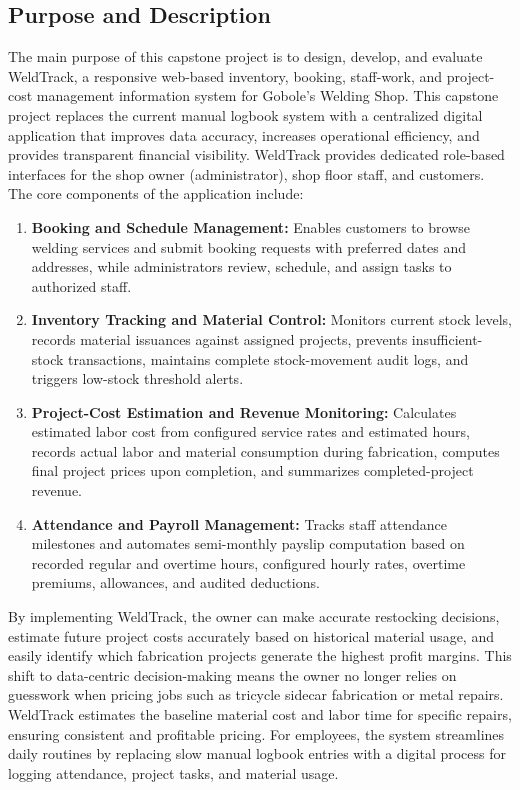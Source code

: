 \documentclass[12pt, letterpaper]{article}
\begin{document}
\subsection{Purpose and Description}
\hspace*{2em}The main purpose of this capstone project is to design, develop, and evaluate WeldTrack, a responsive web-based inventory, booking, staff-work, and project-cost management information system for Gobole's Welding Shop. This capstone project replaces the current manual logbook system with a centralized digital application that improves data accuracy, increases operational efficiency, and provides transparent financial visibility.
\hspace*{2em}WeldTrack provides dedicated role-based interfaces for the shop owner (administrator), shop floor staff, and customers. The core components of the application include:
\begin{enumerate}[label=\alph*.]
    \item \textbf{Booking and Schedule Management:} Enables customers to browse welding services and submit booking requests with preferred dates and addresses, while administrators review, schedule, and assign tasks to authorized staff.
    \item \textbf{Inventory Tracking and Material Control:} Monitors current stock levels, records material issuances against assigned projects, prevents insufficient-stock transactions, maintains complete stock-movement audit logs, and triggers low-stock threshold alerts.
    \item \textbf{Project-Cost Estimation and Revenue Monitoring:} Calculates estimated labor cost from configured service rates and estimated hours, records actual labor and material consumption during fabrication, computes final project prices upon completion, and summarizes completed-project revenue.
    \item \textbf{Attendance and Payroll Management:} Tracks staff attendance milestones and automates semi-monthly payslip computation based on recorded regular and overtime hours, configured hourly rates, overtime premiums, allowances, and audited deductions.
\end{enumerate}
\hspace*{2em}By implementing WeldTrack, the owner can make accurate restocking decisions, estimate future project costs accurately based on historical material usage, and easily identify which fabrication projects generate the highest profit margins. This shift to data-centric decision-making means the owner no longer relies on guesswork when pricing jobs such as tricycle sidecar fabrication or metal repairs. WeldTrack estimates the baseline material cost and labor time for specific repairs, ensuring consistent and profitable pricing. For employees, the system streamlines daily routines by replacing slow manual logbook entries with a digital process for logging attendance, project tasks, and material usage.
\end{document}
